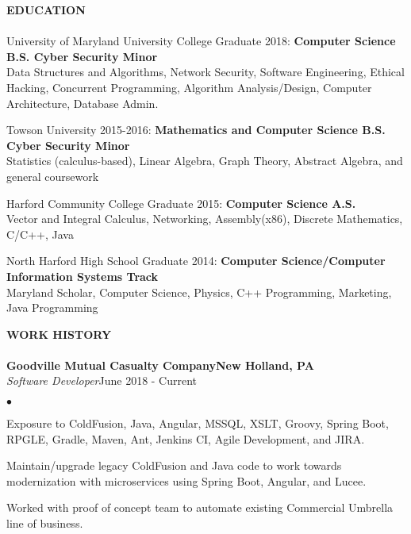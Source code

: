 \documentclass{article}
\newcommand{\lineunder}{
	\vspace*{-4pt}\\ 
	\hspace*{-18pt}\hrulefill \\
}
\newcommand{\header}[1]{
	{\hspace*{-15pt}\vspace*{6pt}\textsc{#1}}\vspace*{-6pt}\lineunder
}
\newcommand{\employer}[5]{
	{\textbf{#1}{\hfill\textbf{#2}}\\ 
	{{\emph{#3}}}\hfill {#4}\\ \hfill {#5}}
}
\newcommand{\education}[3]{
	{#1} \textbf{#2}\\
	{\hspace*{12pt}#3 }\\ 
	\vspace*{5pt}
}
\newenvironment{resumeContent}{
	\begin{list}
		{\small$\bullet$}{\topsep 0pt \itemsep -2pt}}{\vspace*{4pt}
	\end{list}
}
\newcommand{\resumeheader}[1]{
	\vspace*{5pt}
	\header{\textbf{#1}}
}
\begin{document}
	\resumeheader{EDUCATION}
		\education
			{University of Maryland University College Graduate 2018:} 
			{Computer Science B.S. Cyber Security Minor}
			{Data Structures and Algorithms, Network Security, Software Engineering, Ethical Hacking, Concurrent
			\hspace*{12pt}Programming, Algorithm Analysis/Design, Computer Architecture, Database Admin.}
		\education
			{Towson University 2015-2016:} 
			{Mathematics and Computer Science B.S. Cyber Security Minor}
			{Statistics (calculus-based), Linear Algebra, Graph Theory, Abstract Algebra, and general coursework}
		\education
			{Harford Community College Graduate 2015:}
			{Computer Science A.S.}
			{Vector and Integral Calculus, Networking, Assembly(x86), Discrete Mathematics, C/C++, Java}
		\education
			{North Harford High School Graduate 2014:} 
			{Computer Science/Computer Information Systems Track}
			{Maryland Scholar, Computer Science, Physics, C++ Programming, Marketing, Java Programming}

	\resumeheader{WORK HISTORY}
		\employer{Goodville Mutual Casualty Company}{New Holland, PA}{Software Developer} {June 2018 - Current} {}
			\vspace*{-8pt}
			\begin{resumeContent}
				\item Exposure to ColdFusion, Java, Angular, MSSQL, XSLT, Groovy, Spring Boot, RPGLE, Gradle, Maven, Ant, Jenkins CI, Agile Development, and JIRA.
				\item Maintain/upgrade legacy ColdFusion and Java code to work towards modernization with microservices using Spring Boot, Angular, and Lucee.
				\item Worked with proof of concept team to automate existing Commercial Umbrella line of business.
			\end{resumeContent}
\end{document}
